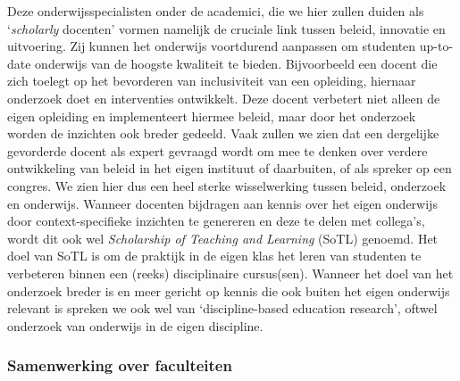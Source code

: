 \documentclass[smallauthor, chapterhaspagenum, nochapterinheader, pagenuminheader,  bigchapnum,medium2, tocpages,  garamond, titleinheader]{jote-book}
\begin{document}
	Deze onderwijsspecialisten onder de academici, die we hier zullen duiden als ‘\emph{scholarly} docenten' vormen namelijk de cruciale link tussen beleid, innovatie en uitvoering. Zij kunnen het onderwijs voortdurend aanpassen om studenten up-to-date onderwijs van de hoogste kwaliteit te bieden. Bijvoorbeeld een docent die zich toelegt op het bevorderen van inclusiviteit van een opleiding, hiernaar onderzoek doet en interventies ontwikkelt. Deze docent verbetert niet alleen de eigen opleiding en implementeert hiermee beleid, maar door het onderzoek worden de inzichten ook breder gedeeld. Vaak zullen we zien dat een dergelijke gevorderde docent als expert gevraagd wordt om mee te denken over verdere ontwikkeling van beleid in het eigen instituut of daarbuiten, of als spreker op een congres. We zien hier dus een heel sterke wisselwerking tussen beleid, onderzoek en onderwijs. Wanneer docenten bijdragen aan kennis over het eigen onderwijs door context-specifieke inzichten te genereren en deze te delen met collega's, wordt dit ook wel \emph{Scholarship of Teaching and Learning} (SoTL) genoemd. Het doel van SoTL is om de praktijk in de eigen klas het leren van studenten te verbeteren binnen een (reeks) disciplinaire cursus(sen). Wanneer het doel van het onderzoek breder is en meer gericht op kennis die ook buiten het eigen onderwijs relevant is spreken we ook wel van ‘discipline-based education research', oftwel onderzoek van onderwijs in de eigen discipline.



	\subsubsection{Samenwerking over faculteiten}
\end{document}
